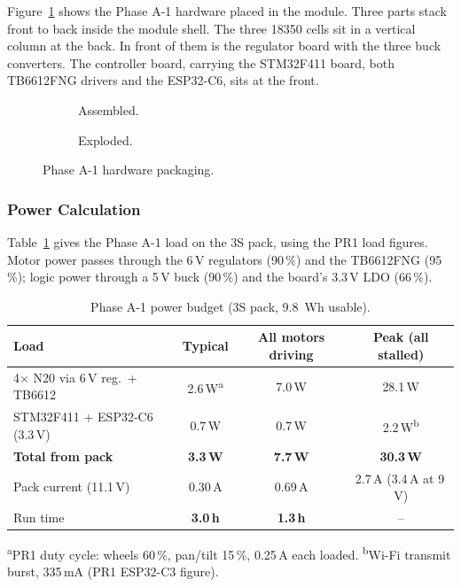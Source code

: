 \documentclass[12pt,a4paper]{article}
\begin{document}
Figure~\ref{fig:a1-cad} shows the Phase A-1 hardware placed in the module.
Three parts stack front to back inside the module shell. The three 18350 cells
sit in a vertical column at the back. In front of them is the regulator board
with the three buck converters. The controller board, carrying the STM32F411
board, both TB6612FNG drivers and the ESP32-C6, sits at the front.

\begin{figure}[!htbp]
  \centering
  \begin{subfigure}[b]{0.36\textwidth}
    \centering
    \caption{Assembled.}
  \end{subfigure}
  \hfill
  \begin{subfigure}[b]{0.6\textwidth}
    \centering
    \caption{Exploded.}
  \end{subfigure}
  \caption{Phase A-1 hardware packaging.}
  \label{fig:a1-cad}
\end{figure}

\subsubsection{Power Calculation}

Table~\ref{tab:a1-power} gives the Phase A-1 load on the 3S pack, using the
PR1 load figures. Motor power passes through the 6\,V regulators (90\,\%) and
the TB6612FNG (95\,\%); logic power through a 5\,V buck (90\,\%) and the
board's 3.3\,V LDO (66\,\%).

\begin{table}[H]
\centering\small
\caption{Phase A-1 power budget (3S pack, \SI{9.8}{Wh} usable).}
\label{tab:a1-power}
\begin{tabular}{@{}lccc@{}}
\toprule
\textbf{Load} & \textbf{Typical} & \textbf{All motors driving} & \textbf{Peak (all stalled)} \\
\midrule
4$\times$ N20 via 6\,V reg.\ + TB6612 & 2.6\,W\textsuperscript{a} & 7.0\,W & 28.1\,W \\
STM32F411 + ESP32-C6 (3.3\,V) & 0.7\,W & 0.7\,W & 2.2\,W\textsuperscript{b} \\
\midrule
\textbf{Total from pack} & \textbf{3.3\,W} & \textbf{7.7\,W} & \textbf{30.3\,W} \\
Pack current (11.1\,V) & 0.30\,A & 0.69\,A & 2.7\,A (3.4\,A at 9\,V) \\
Run time & \textbf{3.0\,h} & \textbf{1.3\,h} & -- \\
\bottomrule
\end{tabular}

\smallskip
{\footnotesize \textsuperscript{a}PR1 duty cycle: wheels 60\,\%, pan/tilt 15\,\%, 0.25\,A each loaded.
\textsuperscript{b}Wi-Fi transmit burst, 335\,mA (PR1 ESP32-C3 figure).}
\end{table}
\end{document}
